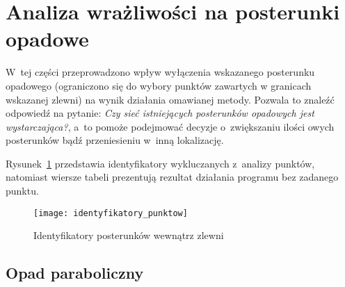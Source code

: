 \section{Analiza wrażliwości na posterunki opadowe}
W~tej części przeprowadzono wpływ wyłączenia wskazanego posterunku opadowego (ograniczono się do wybory punktów zawartych w granicach wskazanej zlewni) na wynik działania omawianej metody. Pozwala to znaleźć odpowiedź na pytanie: \textit{Czy sieć istniejących posterunków opadowych jest wystarczająca?}, a~to pomoże podejmować decyzje o~zwiększaniu ilości owych posterunków bądź przeniesieniu w~inną lokalizację.

Rysunek~\ref{fig:identyfikatory} przedstawia identyfikatory wykluczanych z~analizy punktów, natomiast wiersze tabeli prezentują rezultat działania programu bez zadanego punktu.

\begin{figure}[!ht]
	\centering
	\texttt{[image: identyfikatory\_punktow]}
	\label{fig:identyfikatory}
	\caption{Identyfikatory posterunków wewnątrz zlewni}
\end{figure}

\subsection{Opad paraboliczny}

